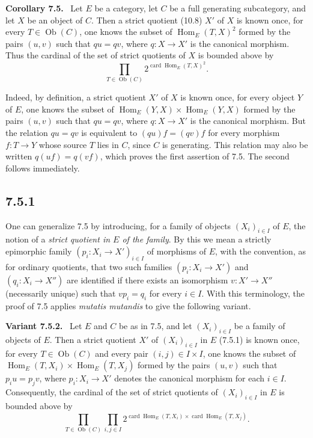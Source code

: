 \documentclass[11pt]{article}
\newcommand{\Ob}{\operatorname{Ob}}
\newcommand{\Hom}{\operatorname{Hom}}
\newcommand{\card}{\operatorname{card}}
\newenvironment{statement}[1]{\par\medskip\noindent\textbf{#1.}\ }{\par\medskip}
\begin{document}
\begin{statement}{Corollary 7.5}
Let $E$ be a category, let $C$ be a full generating subcategory, and let $X$ be an object of $C$. Then a strict quotient (10.8) $X'$ of $X$ is known once, for every $T\in\Ob(C)$, one knows the subset of $\Hom_E(T,X)^2$ formed by the pairs $(u,v)$ such that $qu=qv$, where $q:X\to X'$ is the canonical morphism. Thus the cardinal of the set of strict quotients of $X$ is bounded above by
\[
\prod_{T\in\Ob(C)}2^{\card\Hom_E(T,X)^2}.
\]
\end{statement}

Indeed, by definition, a strict quotient $X'$ of $X$ is known once, for every object $Y$ of $E$, one knows the subset of $\Hom_E(Y,X)\times\Hom_E(Y,X)$ formed by the pairs $(u,v)$ such that $qu=qv$, where $q:X\to X'$ is the canonical morphism. But the relation $qu=qv$ is equivalent to $(qu)f=(qv)f$ for every morphism $f:T\to Y$ whose source $T$ lies in $C$, since $C$ is generating. This relation may also be written $q(uf)=q(vf)$, which proves the first assertion of 7.5. The second follows immediately.

\subsection*{7.5.1}
One can generalize 7.5 by introducing, for a family of objects $(X_i)_{i\in I}$ of $E$, the notion of a \emph{strict quotient in $E$ of the family}. By this we mean a strictly epimorphic family $(p_i:X_i\to X')_{i\in I}$ of morphisms of $E$, with the convention, as for ordinary quotients, that two such families $(p_i:X_i\to X')$ and $(q_i:X_i\to X'')$ are identified if there exists an isomorphism $v:X'\to X''$ (necessarily unique) such that $vp_i=q_i$ for every $i\in I$. With this terminology, the proof of 7.5 applies \emph{mutatis mutandis} to give the following variant.

\begin{statement}{Variant 7.5.2}
Let $E$ and $C$ be as in 7.5, and let $(X_i)_{i\in I}$ be a family of objects of $E$. Then a strict quotient $X'$ of $(X_i)_{i\in I}$ in $E$ (7.5.1) is known once, for every $T\in\Ob(C)$ and every pair $(i,j)\in I\times I$, one knows the subset of $\Hom_E(T,X_i)\times\Hom_E(T,X_j)$ formed by the pairs $(u,v)$ such that $p_i u=p_j v$, where $p_i:X_i\to X'$ denotes the canonical morphism for each $i\in I$. Consequently, the cardinal of the set of strict quotients of $(X_i)_{i\in I}$ in $E$ is bounded above by
\[
\prod_{T\in\Ob(C)}\prod_{i,j\in I}2^{\card\Hom_E(T,X_i)\times \card\Hom_E(T,X_j)}.
\]
\end{statement}
\end{document}
